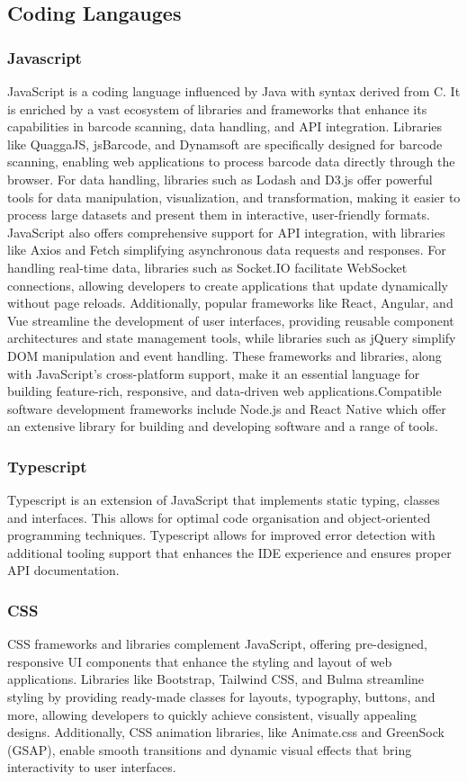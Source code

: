 \documentclass[conference]{IEEEtran}
\begin{document}
\subsection{Coding Langauges}
\subsubsection{Javascript}
JavaScript is a coding language influenced by Java with syntax derived from C.  
It is enriched by a vast ecosystem of libraries and frameworks that enhance its capabilities in barcode scanning, data handling, and API integration. Libraries like QuaggaJS, jsBarcode, and Dynamsoft are specifically designed for barcode scanning, enabling web applications to process barcode data directly through the browser. For data handling, libraries such as Lodash and D3.js offer powerful tools for data manipulation, visualization, and transformation, making it easier to process large datasets and present them in interactive, user-friendly formats. 
JavaScript also offers comprehensive support for API integration, with libraries like Axios and Fetch simplifying asynchronous data requests and responses. For handling real-time data, libraries such as Socket.IO facilitate WebSocket connections, allowing developers to create applications that update dynamically without page reloads. Additionally, popular frameworks like React, Angular, and Vue streamline the development of user interfaces, providing reusable component architectures and state management tools, while libraries such as jQuery simplify DOM manipulation and event handling. These frameworks and libraries, along with JavaScript’s cross-platform support, make it an essential language for building feature-rich, responsive, and data-driven web applications.Compatible software development frameworks include Node.js and React Native which offer an extensive library for building and developing software and a range of tools.  

\subsubsection{Typescript}
Typescript is an extension of JavaScript that implements static typing, classes and interfaces. This allows for optimal code organisation and object-oriented programming techniques. Typescript allows for improved error detection with additional tooling support that enhances the IDE experience and ensures proper API documentation. 

\subsubsection{CSS}
CSS frameworks and libraries complement JavaScript, offering pre-designed, responsive UI components that enhance the styling and layout of web applications. Libraries like Bootstrap, Tailwind CSS, and Bulma streamline styling by providing ready-made classes for layouts, typography, buttons, and more, allowing developers to quickly achieve consistent, visually appealing designs. Additionally, CSS animation libraries, like Animate.css and GreenSock (GSAP), enable smooth transitions and dynamic visual effects that bring interactivity to user interfaces. 
\end{document}
